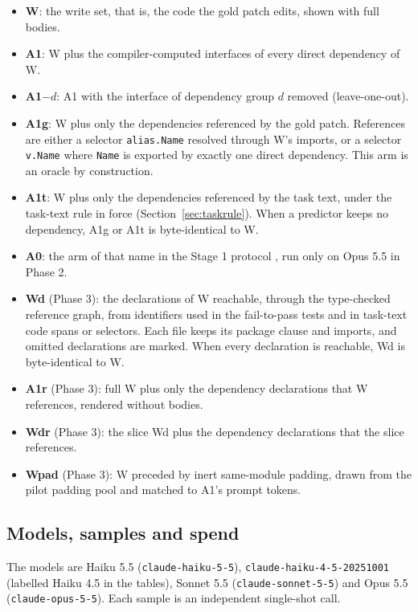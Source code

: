 \begin{itemize}
\item \textbf{W}: the write set, that is, the code the gold patch edits, shown with full bodies.
\item \textbf{A1}: W plus the compiler-computed interfaces of every direct dependency of W.
\item \textbf{A1$-d$}: A1 with the interface of dependency group $d$ removed (leave-one-out).
\item \textbf{A1g}: W plus only the dependencies referenced by the gold patch. References are either a selector \texttt{alias.Name} resolved through W's imports, or a selector \texttt{v.Name} where \texttt{Name} is exported by exactly one direct dependency. This arm is an oracle by construction.
\item \textbf{A1t}: W plus only the dependencies referenced by the task text, under the task-text rule in force (Section~\ref{sec:taskrule}). When a predictor keeps no dependency, A1g or A1t is byte-identical to W.
\item \textbf{A0}: the arm of that name in the Stage 1 protocol \cite{stage1}, run only on Opus 5.5 in Phase 2.
\item \textbf{Wd} (Phase 3): the declarations of W reachable, through the type-checked reference graph, from identifiers used in the fail-to-pass tests and in task-text code spans or selectors. Each file keeps its package clause and imports, and omitted declarations are marked. When every declaration is reachable, Wd is byte-identical to W.
\item \textbf{A1r} (Phase 3): full W plus only the dependency declarations that W references, rendered without bodies.
\item \textbf{Wdr} (Phase 3): the slice Wd plus the dependency declarations that the slice references.
\item \textbf{Wpad} (Phase 3): W preceded by inert same-module padding, drawn from the pilot padding pool and matched to A1's prompt tokens.
\end{itemize}

\subsection{Models, samples and spend}

The models are Haiku 5.5 (\texttt{claude-haiku-5-5}), \texttt{claude-haiku-4-5-20251001} (labelled Haiku 4.5 in the tables), Sonnet 5.5 (\texttt{claude-sonnet-5-5}) and Opus 5.5 (\texttt{claude-opus-5-5}). Each sample is an independent single-shot call.

